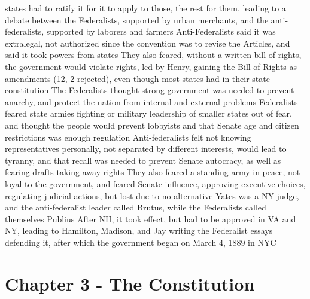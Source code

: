 \documentclass[11 pt, twoside]{article}
\newenvironment{outline*}
{
	\begin{outline}[enumerate]
	}
	{\end{outline}
}
\begin{document}
\begin{outline*}
 states had to ratify it for it to apply to those, the rest for them, leading to a debate between the Federalists, supported by urban merchants, and the anti-federalists, supported by laborers and farmers
\2 Anti-Federalists said it was extralegal, not authorized since the convention was to revise the Articles, and said it took powers from states
\2 They also feared, without a written bill of rights, the government would violate rights, led by Henry, gaining the Bill of Rights as amendments (12, 2 rejected), even though most states had in their state constitution
\2 The Federalists thought strong government was needed to prevent anarchy, and protect the nation from internal and external problems
\1 Federalists feared state armies fighting or military leadership of smaller states out of fear, and thought the people would prevent lobbyists and that Senate age and citizen restrictions was enough regulation
\2 Anti-federalists felt not knowing representatives personally, not separated by different interests, would lead to tyranny, and that recall was needed to prevent Senate autocracy, as well as fearing drafts taking away rights
\2 They also feared a standing army in peace, not loyal to the government, and feared Senate influence, approving executive choices, regulating judicial actions, but lost due to no alternative
\2 Yates was a NY judge, and the anti-federalist leader called Brutus, while the Federalists called themselves Publius
\1 After NH, it took effect, but had to be approved in VA and NY, leading to Hamilton, Madison, and Jay writing the Federalist essays defending it, after which the government began on March 4, 1889 in NYC
\end{outline*}
\section{Chapter 3 - The Constitution}
\end{document}
